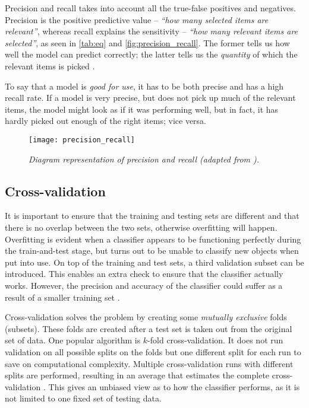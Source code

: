 Precision and recall takes into account all the true-false positives and negatives. Precision is the positive predictive value -- \textit{``how many selected items are relevant''}, whereas recall explains the sensitivity -- \textit{``how many relevant items are selected''}, as seen in \autoref{tab:eq} and \autoref{fig:precision_recall}. The former tells us how well the model can predict correctly; the latter tells us the \textit{quantity} of which the relevant items is picked \cite{precision-recall-wiki}.

To say that a model is \textit{good for use}, it has to be both precise and has a high recall rate. If a model is very precise, but does not pick up much of the relevant items, the model might look as if it was performing well, but in fact, it has hardly picked out enough of the right items; vice versa.

\begin{figure}[H]
  \centering
  \texttt{[image: precision\_recall]}
  \caption{\textit{ Diagram representation of precision and recall (adapted from \protect{}). }}
  \label{fig:precision_recall}
\end{figure}

\subsection{Cross-validation}
It is important to ensure that the training and testing sets are different and that there is no overlap between the two sets, otherwise overfitting will happen. Overfitting is evident when a classifier appears to be functioning perfectly during the train-and-test stage, but turns out to be unable to classify new objects when put into use. On top of the training and test sets, a third validation subset can be introduced. This enables an extra check to ensure that the classifier actually works.  However, the precision and accuracy of the classifier could suffer as a result of a smaller training set \cite{cross-val-scikit}. 

Cross-validation solves the problem by creating some \textit{mutually exclusive} folds (subsets). These folds are created after a test set is taken out from the original set of data. One popular algorithm is $k$-fold cross-validation. It does not run validation on all possible splits on the folds but one different split for each run to save on computational complexity. Multiple cross-validation runs with different splits are performed, resulting in an average that estimates the complete cross-validation \cite{cross-val-kohavi}. This gives an unbiased view as to how the classifier performs, as it is not limited to one fixed set of testing data.

